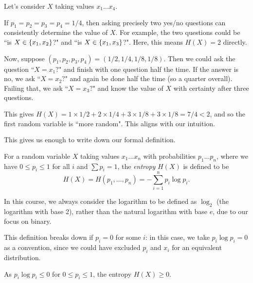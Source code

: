 \documentclass{article}
\begin{document}
\begin{example}
	Let's consider $X$ taking values $x_1 \dots x_4$.
    
    If $p_1 = p_2 = p_3 = p_4 = 1/4$,
    then asking precisely two yes/no questions
    can consistently determine the value of $X$.
    For example, the two questions could be
    ``is $X \in \left\lbrace x_1, x_2 \right\rbrace$?"
    and
    ``is $X \in \left\lbrace x_1, x_3 \right\rbrace$?".
    Here, this means $H(X) = 2$ directly.
    
    Now, suppose
    $(p_1, p_2, p_3, p_4) = (1/2, 1/4, 1/8, 1/8)$.
    Then we could ask the question ``$X = x_1?$"
    and finish with one question half the time.
    If the answer is no, we ask ``$X = x_2?$"
    and again be done half the time (so a quarter overall).
    Failing that, we ask ``$X = x_3?$"
    and know the value of $X$ with certainty after three questions.
    
    This gives
    $H(X) = 1 \times 1/2 + 2 \times 1/4 + 3 \times 1/8 +  3 \times 1/8 = 7/4 < 2$,
    and so the first random variable is ``more random".
    This aligns with our intuition.
\end{example}

This gives us enough to write down our formal definition.

\begin{definition}[Entropy]
	\label{random-variable-entropy}
    For a random variable $X$
    taking values $x_1 \dots x_n$
    with probabilities $p_1 \dots p_n$,
    where we have $0 \leq p_i \leq 1$ for all $i$
    and $\sum p_i = 1$,
    the \textit{entropy} $H(X)$ is defined to be
    \[
	H(X) = H(p_1, \dots, p_n) =
	-\sum_{i=1}^n p_i \log p_i.
	\]
\end{definition}

\begin{note}
	In this course, we always consider the logarithm to be defined as $\log_2$
	(the logarithm with base 2),
	rather than the natural logarithm with base $e$,
	due to our focus on binary.
\end{note}

\begin{note}
	This definition breaks down if $p_i = 0$ for some $i$:
	in this case, we take $p_i \log p_i = 0$ as a convention,
	since we could have excluded $p_i$ and $x_i$ for an equivalent distribution.
\end{note}

\begin{corollary}
    As $p_i \log p_i \leq 0$ for $0 \leq p_i \leq 1$,
    the entropy $H(X) \geq 0$.
\end{corollary}
\end{document}
